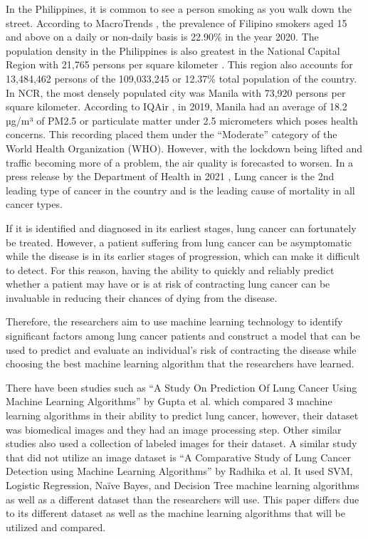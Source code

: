 \documentclass[runningheads]{llncs}
\begin{document}
In the Philippines, it is common to see a person smoking as you walk down the street. According to MacroTrends \cite{macrotrends2022}, the prevalence of Filipino smokers aged 15 and above on a daily or non-daily basis is 22.90\% in the year 2020. The population density in the Philippines is also greatest in the National Capital Region with 21,765 persons per square kilometer \cite{philippinestatisticsauthority2021}. This region also accounts for 13,484,462 persons of the 109,033,245 or 12.37\% total population of the country. In NCR, the most densely populated city was Manila with 73,920 persons per square kilometer. According to IQAir \cite{IQAir2022}, in 2019, Manila had an average of 18.2 µg/m³ of PM2.5 or particulate matter under 2.5 micrometers which poses health concerns. This recording placed them under the “Moderate” category of the World Health Organization (WHO). However, with the lockdown being lifted and traffic becoming more of a problem, the air quality is forecasted to worsen. In a press release by the  Department of Health in 2021 \cite{doh2021}, Lung cancer is the 2nd leading type of cancer in the country and is the leading cause of mortality in all cancer types.

If it is identified and diagnosed in its earliest stages, lung cancer can fortunately be treated. However, a patient suffering from lung cancer can be asymptomatic while the disease is in its earlier stages of progression, which can make it difficult to detect. For this reason, having the ability to quickly and reliably predict whether a patient may have or is at risk of contracting lung cancer can be invaluable in reducing their chances of dying from the disease.

Therefore, the researchers aim to use machine learning technology to identify significant factors among lung cancer patients and construct a model that can be used to predict and evaluate an individual's risk of contracting the disease while choosing the best machine learning algorithm that the researchers have learned.

There have been studies such as “A Study On Prediction Of Lung Cancer Using Machine Learning Algorithms” by Gupta et al. \cite{gupta2022} which compared 3 machine learning algorithms in their ability to predict lung cancer, however, their dataset was biomedical images and they had an image processing step. Other similar studies also used a collection of labeled images for their dataset. A similar study that did not utilize an image dataset is “A Comparative Study of Lung Cancer Detection using Machine Learning Algorithms” by Radhika et al. \cite{radhika2019} It used SVM, Logistic Regression, Naïve Bayes, and Decision Tree machine learning algorithms as well as a different dataset than the researchers will use. This paper differs due to its different dataset as well as the machine learning algorithms that will be utilized and compared.
\end{document}

